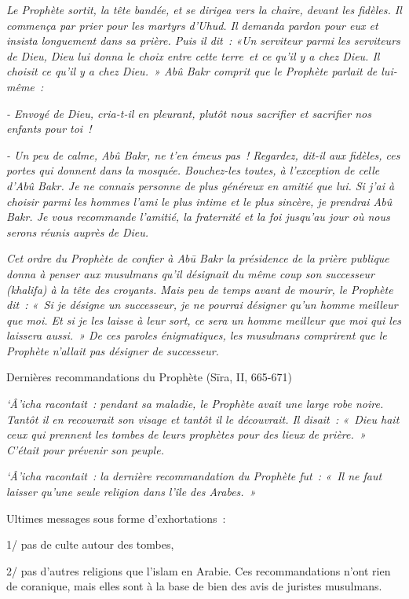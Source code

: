 \emph{Le Prophète sortit, la tête bandée, et se dirigea vers la chaire,
devant les fidèles. Il commença par prier pour les martyrs d'Uhud. Il
demanda pardon pour eux et insista longuement dans sa prière. Puis il
dit~: «Un serviteur parmi les serviteurs de Dieu, Dieu lui donna le
choix entre cette terre~et ce qu'il y a chez Dieu. Il choisit ce qu'il y
a chez Dieu.~» Abû Bakr comprit que le Prophète parlait de lui-même~:}

\emph{- Envoyé de Dieu, cria-t-il en pleurant, plutôt nous sacrifier et
sacrifier nos enfants pour toi~!}

\emph{- Un peu de calme, Abû Bakr, ne t'en émeus pas~! Regardez, dit-il
aux fidèles, ces portes qui donnent dans la mosquée. Bouchez-les toutes,
à l'exception de celle d'Abû Bakr. Je ne connais personne de plus
généreux en amitié que lui. Si j'ai à choisir parmi les hommes l'ami le
plus intime et le plus sincère, je prendrai Abû Bakr. Je vous recommande
l'amitié, la fraternité et la foi jusqu'au jour où nous serons réunis
auprès de Dieu.}

\emph{Cet ordre du Prophète de confier à Abū Bakr la présidence de la
prière publique donna à penser aux musulmans qu'il désignait du même
coup son successeur (khalifa) à la tête des croyants. Mais peu de temps
avant de mourir, le Prophète dit~: «~Si je désigne un successeur, je ne
pourrai désigner qu'un homme meilleur que moi. Et si je les laisse à
leur sort, ce sera un homme meilleur que moi qui les laissera aussi.~»
De ces paroles énigmatiques, les musulmans comprirent que le Prophète
n'allait pas désigner de successeur.}

Dernières recommandations du Prophète (Sīra, II, 665-671)

\emph{`Â'icha racontait~: pendant sa maladie, le Prophète avait une
large robe noire. Tantôt il en recouvrait son visage et tantôt il le
découvrait. Il disait~: «~Dieu hait ceux qui prennent les tombes de
leurs prophètes pour des lieux de prière.~» C'était pour prévenir son
peuple.}

\emph{`Â'icha racontait~: la dernière recommandation du Prophète fut~:
«~Il ne faut laisser qu'une seule religion dans l'île des Arabes.~»}

Ultimes messages sous forme d'exhortations~:

1/ pas de culte autour des tombes,

2/ pas d'autres religions que l'islam en Arabie. Ces recommandations
n'ont rien de coranique, mais elles sont à la base de bien des avis de
juristes musulmans.

